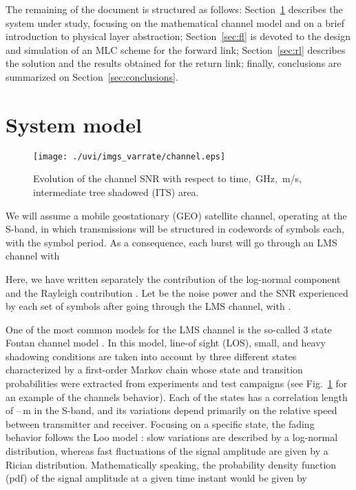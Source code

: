 \documentclass[journal,onecolumn,10pt,a4paper]{IEEEtran}
\begin{document}
The remaining of the document is structured as follows: Section~\ref{sec:sys_model} describes the system under study, focusing on the mathematical channel model and on a brief introduction to physical layer abstraction; Section~\ref{sec:fl} is devoted to the design and simulation of an MLC scheme for the forward link; Section~\ref{sec:rl} describes the solution and the results obtained for the return link; finally, conclusions are summarized on Section~\ref{sec:conclusions}.

\section{System model}\label{sec:sys_model}
\begin{figure}
 \centering
 \texttt{[image: ./uvi/imgs\_varrate/channel.eps]}
\caption{Evolution of the channel SNR with respect to time, \,GHz, \,m/s, intermediate tree shadowed (ITS) area.}
 \label{fig:channel}
\end{figure}

We will assume a mobile geostationary (GEO) satellite channel, operating at the S-band, in which transmissions will be structured in codewords of  symbols each, with  the symbol period. As a consequence, each burst will go through an LMS channel  with

Here, we have written separately the contribution of the log-normal component  and the Rayleigh contribution . Let  be the noise power and   the SNR experienced by each set of  symbols after going through the LMS channel, with . 

One of the most common models for the LMS channel is the so-called 3 state Fontan channel model \cite{fontan01}. In this model,
line-of sight (LOS), small, and heavy shadowing conditions are taken into account by three different states characterized  by a first-order Markov chain whose state and transition probabilities were extracted from experiments and test
campaigns (see Fig.~\ref{fig:channel} for an example of the channels behavior). Each of the states has a correlation length of --\,m in the S-band, and its variations
depend primarily on the relative speed between transmitter and receiver. Focusing on a specific state, the fading behavior follows the Loo model \cite{loo1985}: slow variations are described by a log-normal distribution, whereas fast fluctuations of the signal amplitude are given by a Rician distribution. Mathematically speaking, the probability density function (pdf) of the signal amplitude at a given time instant would be given by
\end{document}
